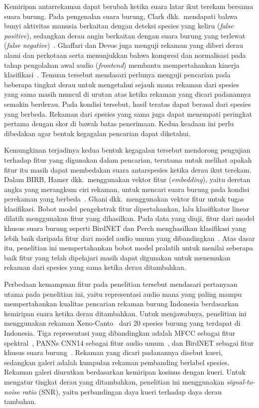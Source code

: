 Kemiripan antarrekaman dapat berubah ketika suara latar ikut terekam
bersama suara burung. Pada pengenalan suara burung, Clark dkk.\ mendapati
bahwa bunyi aktivitas manusia berkaitan dengan deteksi spesies yang
keliru (\textit{false positive}), sedangkan derau angin berkaitan dengan
suara burung yang terlewat (\textit{false
negative})~\cite{clark2023soundscape}. Ghaffari dan Devos juga menguji
rekaman yang diberi derau alami dan perkotaan serta menunjukkan bahwa
kompresi dan normalisasi pada tahap pengolahan awal audio
(\textit{frontend}) membantu mempertahankan kinerja
klasifikasi~\cite{ghaffari2024frontends}. Temuan tersebut mendasari
perlunya menguji pencarian pada beberapa tingkat derau untuk mengetahui
sejauh mana rekaman dari spesies yang sama masih muncul di urutan atas
ketika rekaman yang dicari padanannya semakin berderau. Pada kondisi
tersebut, hasil teratas dapat berasal dari spesies yang berbeda. Rekaman
dari spesies yang sama juga dapat menempati peringkat pertama dengan
skor di bawah batas penerimaan. Kedua keadaan ini perlu dibedakan agar
bentuk kegagalan pencarian dapat diketahui.

Kemungkinan terjadinya kedua bentuk kegagalan tersebut mendorong
pengujian terhadap fitur yang digunakan dalam pencarian, terutama untuk
melihat apakah fitur itu masih dapat membedakan suara antarspesies
ketika derau ikut terekam. Dalam BIRB, Hamer dkk.\ menggunakan vektor
fitur (\textit{embedding}), yaitu deretan angka yang merangkum ciri
rekaman, untuk mencari suara burung pada kondisi perekaman yang
berbeda~\cite{hamer2023birb}. Ghani dkk.\ menggunakan vektor fitur untuk
tugas klasifikasi. Bobot model pengekstrak fitur dipertahankan, lalu
klasifikator linear dilatih menggunakan fitur yang dihasilkan. Pada data
yang diuji, fitur dari model khusus suara burung seperti BirdNET dan
Perch menghasilkan klasifikasi yang lebih baik daripada fitur dari model
audio umum yang dibandingkan~\cite{ghani2023embeddings}. Atas dasar itu,
penelitian ini mempertahankan bobot model pralatih untuk menilai
seberapa baik fitur yang telah dipelajari masih dapat digunakan untuk
menemukan rekaman dari spesies yang sama ketika derau ditambahkan.

Perbedaan kemampuan fitur pada penelitian tersebut mendasari pertanyaan
utama pada penelitian ini, yaitu representasi audio mana yang paling mampu
mempertahankan kualitas pencarian rekaman burung Indonesia berdasarkan
kemiripan suara ketika derau ditambahkan. Untuk menjawabnya, penelitian
ini menggunakan rekaman Xeno-Canto~\cite{xenocantoArchive} dari 20 spesies burung yang terdapat
di Indonesia. Tiga representasi yang
dibandingkan adalah MFCC sebagai fitur spektral~\cite{peng2025birdfbank},
PANNs CNN14 sebagai fitur audio umum~\cite{kong2020panns}, dan BirdNET
sebagai fitur khusus suara burung~\cite{kahl2021birdnet}. Rekaman yang
dicari padanannya disebut kueri, sedangkan galeri adalah kumpulan rekaman
pembanding berlabel spesies. Rekaman galeri diurutkan berdasarkan
kemiripan kosinus dengan kueri. Untuk mengatur tingkat derau yang
ditambahkan, penelitian ini menggunakan \textit{signal-to-noise ratio}
(SNR), yaitu perbandingan daya kueri terhadap daya derau tambahan.

